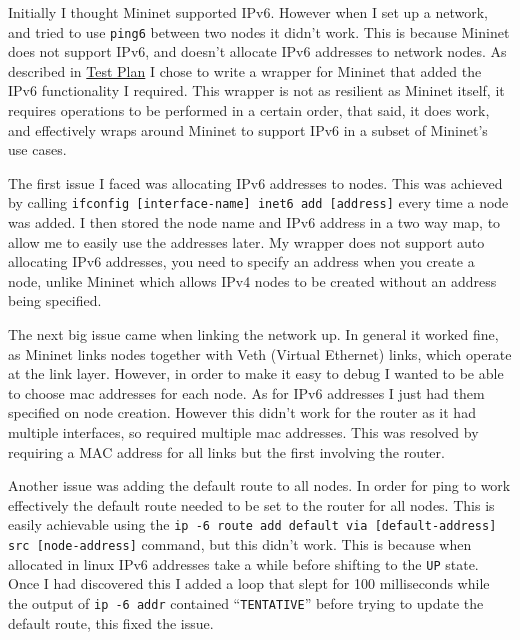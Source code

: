 \documentclass[12pt,a4paper,twoside,openright]{report}
\begin{document}
\bigskip

Initially I thought Mininet\cite{mininet} supported IPv6.  However when I set up a network, and tried to use \verb!ping6! between two nodes it didn't work.  This is because Mininet does not support IPv6, and doesn't allocate IPv6 addresses to network nodes.  As described in \hyperref[sec::test_plan]{Test Plan} I chose to write a wrapper for Mininet that added the IPv6 functionality I required.  This wrapper is not as resilient as Mininet itself, it requires operations to be performed in a certain order, that said, it does work, and effectively wraps around Mininet to support IPv6 in a subset of Mininet's use cases.

\bigskip

The first issue I faced was allocating IPv6 addresses to nodes. This was achieved by calling \verb!ifconfig [interface-name] inet6 add [address]! every time a node was added. I then stored the node name and IPv6 address in a two way map, to allow me to easily use the addresses later. My wrapper does not support auto allocating IPv6 addresses, you need to specify an address when you create a node, unlike Mininet which allows IPv4 nodes to be created without an address being specified.

\bigskip

The next big issue came when linking the network up. In general it worked fine, as Mininet links nodes together with Veth (Virtual Ethernet) links, which operate at the link layer.  However, in order to make it easy to debug I wanted to be able to choose mac addresses for each node. As for IPv6 addresses I just had them specified on node creation.  However this didn't work for the router as it had multiple interfaces, so required multiple mac addresses. This was resolved by requiring a MAC address for all links but the first involving the router.

\bigskip

Another issue was adding the default route to all nodes.  In order for ping to work effectively the default route needed to be set to the router for all nodes.  This is easily achievable using the \verb!ip -6 route add default via [default-address] src [node-address]! command, but this didn't work.  This is because when allocated in linux IPv6 addresses take a while before shifting to the \verb!UP! state.  Once I had discovered this I added a loop that slept for 100 milliseconds while the output of \verb!ip -6 addr! contained ``\verb!TENTATIVE!'' before trying to update the default route, this fixed the issue.
\end{document}
